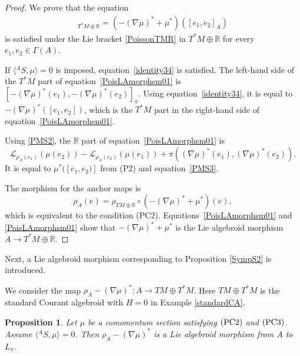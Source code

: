 \documentclass[10pt,a4paper]{amsart}
\numberwithin{equation}{section}
\newtheorem{Proposition}[Theorem]{Proposition}
 { \theoremstyle{definition}
\newtheorem{Definition}[Theorem]{Definition}
\newtheorem{Note}[Theorem]{Note}
\newtheorem{Example}[Theorem]{Example}
\newtheorem{Remark}[Theorem]{Remark}
\newtheorem{Question}[Theorem]{Question}
 }
\def\bR{{\mathbb{R}}}
\newcommand{\calL}{{\mathcal L}}
\newcommand{\rhoa}{{\rho_A}}
\newcommand{\rhotr}{\rho_{TM \oplus \bR}}
\begin{document}
\begin{proof}
We prove that the equation
\begin{gather}
[(-(\nabla \mu)^* + \mu^*)(e_1), (-(\nabla \mu)^* + \mu^*)(e_2)]_{T^*M \oplus \bR} =
(-(\nabla \mu)^* + \mu^*)([e_1, e_2]_A)
\label{PoisLAmorphsm01}
\end{gather}
is satisfied under the Lie bracket \eqref{PoissonTMR} in $T^*M \oplus \bR$
for every $e_1, e_2 \in \Gamma(A)$.

If $\bigl\langle {}^A S,\mu\bigr\rangle = 0$ is imposed, equation~\eqref{identity34} is satisfied.
The left-hand side of the $T^*M$ part of equation~\eqref{PoisLAmorphsm01} is
$
 [-(\nabla \mu)^*(e_1), -(\nabla \mu)^*(e_2)]_{\pi}
$.
Using equation~\eqref{identity34}, it is equal to
$-(\nabla \mu)^*([e_1, e_2])$, which is the $T^*M$ part in the right-hand side of equation~\eqref{PoisLAmorphsm01}.

Using \eqref{PMS2}, the $\bR$ part of equation~\eqref{PoisLAmorphsm01} is
\[
\calL_{\rhoa(e_1)} (\mu(e_2)) - \calL_{\rhoa(e_2)} (\mu(e_1))
+ \pi((\nabla \mu)^*(e_1), (\nabla \mu)^*(e_2)).
\]
It is equal to $\mu^*([e_1, e_2)]$ from (P2) and equation~\eqref{PMS3}.

The morphism for the anchor maps is
\[%
\rhoa(e) = \rhotr \circ (-(\nabla \mu)^* + \mu^*)(e),
\]
which is equivalent to the condition (PC2).
Equations~\eqref{PoisLAmorphsm01} and \eqref{PoisLAmorphsm01} show that
$-(\nabla \mu)^* + \mu^*$ is the Lie algebroid morphism
$A \rightarrow T^*M \oplus \bR$.
\end{proof}

Next, a Lie algebroid morphism
corresponding to Proposition \ref{SympS2} is introduced.

We consider the map $\rhoa - (\nabla \mu)^*\colon A \rightarrow TM \oplus T^*M$.
Here $TM \oplus T^*M$ is the standard Courant algebroid
with $H=0$ in Example \ref{standardCA}.

\begin{Proposition}\label{PoisP2}
Let $\mu$ be a comomentum section satisfying $\rm (PC2)$ and $\rm (PC3)$.
Assume $\bigl\langle {}^A S,\mu\bigr\rangle = 0$.
Then $\rhoa - (\nabla \mu)^*$ is a Lie algebroid morphism
from $A$ to $L_{\pi}$.
\end{Proposition}
\end{document}
